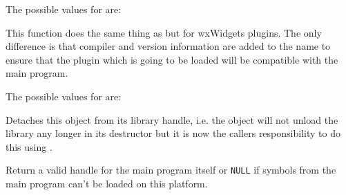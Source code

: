The possible values for  are:

\begin{twocollist}
\end{twocollist}





\label{wxdynamiclibrarycanonicalizepluginname}


This function does the same thing as 
 but for wxWidgets
plugins. The only difference is that compiler and version information are added
to the name to ensure that the plugin which is going to be loaded will be
compatible with the main program.

The possible values for  are:

\begin{twocollist}
\end{twocollist}


\label{wxdynamiclibrarydetach}


Detaches this object from its library handle, i.e. the object will not unload
the library any longer in its destructor but it is now the callers
responsibility to do this using .


\label{wxdynamiclibrarygetprogramhandle}


Return a valid handle for the main program itself or \texttt{NULL} if symbols
from the main program can't be loaded on this platform.


\label{wxdynamiclibrarygetsymbol}


